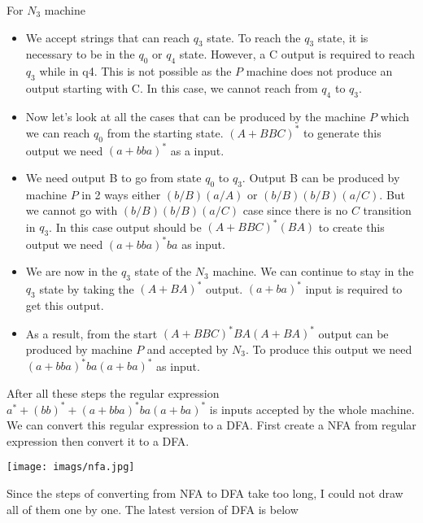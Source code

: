 \documentclass[12pt]{article}
\begin{document}
For $N_3$ machine
\begin{itemize}
    \item We accept strings that can reach $q_3$ state. To reach the $q_3$ state, it is necessary to be in the $q_0$ or $q_4$ state. However, a C output is required to reach $q_3$ while in q4.  This is not possible as the $P$ machine does not produce an output starting with C. In this case, we cannot reach from $q_4$ to $q_3$. 
    \item Now let's look at all the cases that can be produced by the machine $P$  which we can reach $q_0$ from the starting state. $(A + BBC)^*$ to generate this output we need $(a+bba)^*$ as a input.
    \item We need output B to go from state $q_0$ to $q_3$. Output B can be produced by machine $P$ in 2 ways either $(b/B)(a/A)$ or $(b/B)(b/B)(a/C)$. But we cannot go with $(b/B)(b/B)(a/C)$ case since there is no $C$ transition in $q_3$. In this case output should be $(A + BBC)^*(BA)$ to create this output we need $(a+bba)^*ba$ as input.
    \item We are now in the $q_3$ state of the $N_3$ machine. We can continue to stay in the $q_3$ state by taking the $(A+BA)^*$ output. $(a+ba)^*$ input is required to get this output.
    \item As a result, from the start $(A+BBC)^*BA(A+BA)^*$ output can be produced by machine $P$ and accepted by $N_3$. To produce this output we need $(a+bba)^*ba(a+ba)^*$ as input.
\end{itemize}

After all these steps the regular expression $a^* + (bb)^* + (a+bba)^*ba(a + ba)^*$  is inputs accepted by the whole machine. We can convert this regular expression to a DFA. First create a NFA from regular expression then convert it to a DFA.

\texttt{[image: imags/nfa.jpg]} 

Since the steps of converting from NFA to DFA take too long, I could not draw all of them one by one. The latest version of DFA is below
\end{document}
